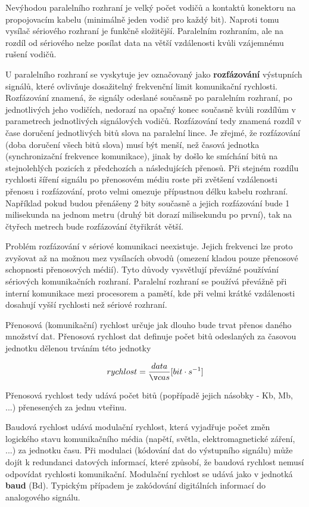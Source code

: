 Nevýhodou paralelního rozhraní je velký počet vodičů a kontaktů konektoru na propojovacím kabelu (minimálně jeden vodič pro každý bit). Naproti tomu vysílač sériového rozhraní je funkčně složitější. Paralelním rozhraním, ale na rozdíl od sériového nelze posílat data na větší vzdálenosti kvůli vzájemnému rušení vodičů.

U paralelního rozhraní se vyskytuje jev označovaný jako {\bf rozfázování} výstupních signálů, které ovlivňuje dosažitelný frekvenční limit komunikační rychlosti. Rozfázování znamená, že signály odeslané současně po paralelním rozhraní, po jednotlivých jeho vodičích, nedorazí na opačný konec současně kvůli rozdílům v parametrech jednotlivých signálových vodičů. Rozfázování tedy znamená rozdíl v čase doručení jednotlivých bitů slova na paralelní lince. Je zřejmé, že rozfázování (doba doručení všech bitů slova) musí být menší, než časová jednotka (synchronizační frekvence komunikace), jinak by došlo ke smíchání bitů na stejnolehlých pozicích z předchozích a následujících přenosů. Při stejném rozdílu rychlosti šíření signálu po přenosovém médiu roste při zvětšení vzdálenosti přenosu i rozfázování, proto velmi omezuje přípustnou délku kabelu rozhraní. Například pokud budou přenášeny 2 bity současně a jejich rozfázování bude 1 milisekunda na jednom metru (druhý bit dorazí milisekundu po první), tak na čtyřech metrech bude rozfázování čtyřikrát větší. 

Problém rozfázování v sériové komunikaci neexistuje. Jejich frekvenci lze proto zvyšovat až na možnou mez vysílacích obvodů (omezení kladou pouze přenosové schopnosti přenosových médií). Tyto důvody vysvětlují převážné používání sériových komunikačních rozhraní. Paralelní rozhraní se používá převážně při interní komunikace mezi procesorem a pamětí, kde při velmi krátké vzdálenosti dosahují vyšší rychlosti než sériové rozhraní.


Přenosová (komunikační) rychlost určuje jak dlouho bude trvat přenos daného množství dat. Přenosová rychlost dat definuje počet bitů odeslaných za časovou jednotku dělenou trváním této jednotky 

$$rychlost={data\over čas}[bit \cdot s^{-1}]$$	

Přenosová rychlost tedy udává počet bitů (popřípadě jejich násobky - Kb, Mb, ...) přenesených za jednu vteřinu.

Baudová rychlost udává modulační rychlost, která vyjadřuje počet změn logického stavu komunikačního média (napětí, světla, elektromagnetické záření, ...) za jednotku času. Při modulaci (kódování dat do výstupního signálu) může dojít k redundanci datových informací, které způsobí, že baudová rychlost nemusí odpovídat rychlosti komunikační. Modulační rychlost se udává jako v jednotká {\bf baud} (Bd). Typickým případem je zakódování digitálních informací do analogového signálu. 

